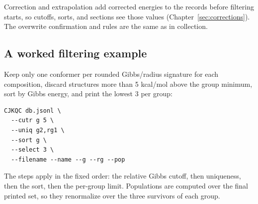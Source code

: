 Correction and extrapolation add corrected energies to the records before
filtering starts, so cutoffs, sorts, and sections see those values
(Chapter~\ref{sec:corrections}). The overwrite confirmation and 
rules are the same as in collection.

\subsection{A worked filtering example}\label{sec:filtering-example}

Keep only one conformer per rounded Gibbs/radius signature for each
composition, discard structures more than 5 kcal/mol above the group minimum,
sort by Gibbs energy, and print the lowest 3 per group:

\begin{verbatim}
CJKQC db.jsonl \
  --cutr g 5 \
  --uniq g2,rg1 \
  --sort g \
  --select 3 \
  --filename --name --g --rg --pop
\end{verbatim}

The steps apply in the fixed order: the relative Gibbs cutoff, then
uniqueness, then the sort, then the per-group limit. Populations are computed
over the final printed set, so they renormalize over the three survivors of
each group.
